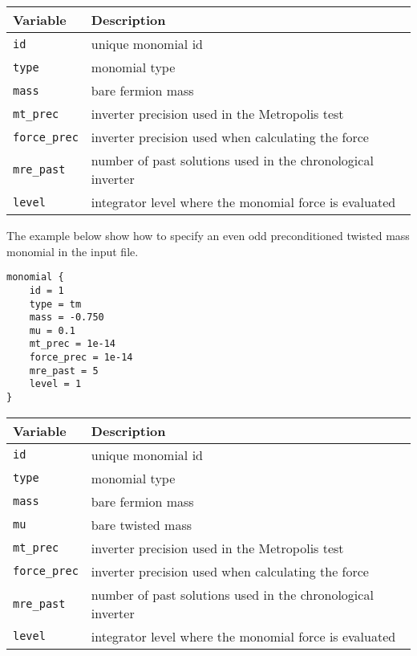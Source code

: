 \documentclass[12pt]{article}
\begin{document}
\vspace{2mm}

\begin{center}
\begin{tabular}{l|l}
 Variable & Description \\
 \hline
 \verb|id|         & unique monomial id \\
 \verb|type|       & monomial type \\
 \verb|mass|       & bare fermion mass \\
 \verb|mt_prec|    & inverter precision used in the Metropolis test \\
 \verb|force_prec| & inverter precision used when calculating the force \\
 \verb|mre_past|   & number of past solutions used in the chronological inverter \\
 \verb|level|      & integrator level where the monomial force is evaluated
\end{tabular}
\end{center}

The example below show how to specify an even odd preconditioned twisted mass monomial in the input file.
\begin{center}
\begin{minipage}{55mm}
\begin{framed}
\begin{verbatim}
monomial {
    id = 1
    type = tm
    mass = -0.750
    mu = 0.1
    mt_prec = 1e-14
    force_prec = 1e-14
    mre_past = 5
    level = 1
}
\end{verbatim}
\vspace{-5mm}
\end{framed}
\end{minipage}
\end{center}

\vspace{2mm}

\begin{center}
\begin{tabular}{l|l}
 Variable & Description \\
 \hline
 \verb|id|         & unique monomial id \\
 \verb|type|       & monomial type \\
 \verb|mass|       & bare fermion mass \\
 \verb|mu|         & bare twisted mass\\
 \verb|mt_prec|    & inverter precision used in the Metropolis test \\
 \verb|force_prec| & inverter precision used when calculating the force \\
 \verb|mre_past|   & number of past solutions used in the chronological inverter \\
 \verb|level|      & integrator level where the monomial force is evaluated
\end{tabular}
\end{center}
\end{document}
